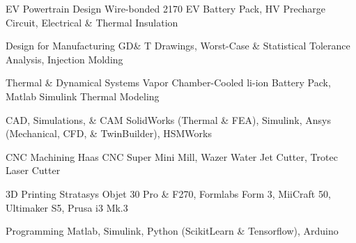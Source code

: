 


\begin{cvskills}





\cvskill
{EV Powertrain Design}
{Wire-bonded 2170 EV Battery Pack, HV Precharge Circuit, Electrical \& Thermal Insulation}

\cvskill
{Design for Manufacturing}
{GD\& T Drawings, Worst-Case \& Statistical Tolerance Analysis, Injection Molding}

\cvskill
{Thermal \& Dynamical Systems}
{Vapor Chamber-Cooled li-ion Battery Pack, Matlab Simulink Thermal Modeling}

\cvskill
{CAD, Simulations, \& CAM} %
{SolidWorks (Thermal \& FEA), Simulink, Ansys (Mechanical, CFD, \& TwinBuilder), HSMWorks} %

\cvskill
{CNC Machining}
{Haas CNC Super Mini Mill, Wazer Water Jet Cutter, Trotec Laser Cutter}

\cvskill
{3D Printing} %
{Stratasys Objet 30 Pro \& F270, Formlabs Form 3, MiiCraft 50, Ultimaker S5, Prusa i3 Mk.3} %

\cvskill
{Programming} %
{Matlab, Simulink, Python (ScikitLearn \& Tensorflow), Arduino} %



\end{cvskills}